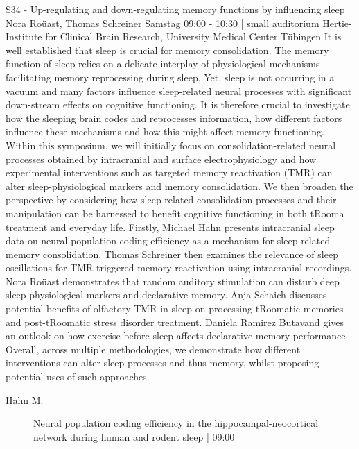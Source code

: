 
            \begin{symposium}
            {S34 - Up-regulating and down-regulating memory functions by influencing sleep}
            {Nora Roüast, Thomas Schreiner}
            {Samstag 09:00 - 10:30 | small auditorium}
            {Hertie-Institute for Clinical Brain Research, University Medical Center Tübingen}
            It is well established that sleep is crucial for memory consolidation. The memory function of sleep relies on a delicate interplay of physiological mechanisms facilitating memory reprocessing during sleep. Yet, sleep is not occurring in a vacuum and many factors influence sleep-related neural processes with significant down-stream effects on cognitive functioning. It is therefore crucial to investigate how the sleeping brain codes and reprocesses information, how different factors influence these mechanisms and how this might affect memory functioning.
Within this symposium, we will initially focus on consolidation-related neural processes obtained by intracranial and surface electrophysiology and how experimental interventions such as targeted memory reactivation (TMR) can alter sleep-physiological markers and memory consolidation. We then broaden the perspective by considering how sleep-related consolidation processes and their manipulation can be harnessed to benefit cognitive functioning in both tRooma treatment and everyday life.
Firstly, Michael Hahn presents intracranial sleep data on neural population coding efficiency as a mechanism for sleep-related memory consolidation. Thomas Schreiner then examines the relevance of sleep oscillations for TMR triggered memory reactivation using intracranial recordings. Nora Roüast demonstrates that random auditory stimulation can disturb deep sleep physiological markers and declarative memory. Anja Schaich discusses potential benefits of olfactory TMR in sleep on processing tRoomatic memories and post-tRoomatic stress disorder treatment. Daniela Ramirez Butavand gives an outlook on how exercise before sleep affects declarative memory performance.
Overall, across multiple methodologies, we demonstrate how different interventions can alter sleep processes and thus memory, whilst proposing potential uses of such approaches.
            \begin{description}    
            
                \item [ Hahn M.] Neural population coding efficiency in the hippocampal-neocortical network during human and rodent sleep \textcolor{mygray}{ | 09:00}    
                

\end{description}
\end{symposium}
